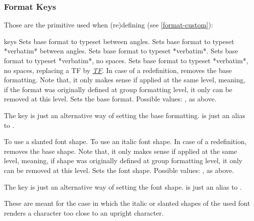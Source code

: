 \documentclass{article}
\begin{document}
\subsubsection{Format Keys}\label{format-keys}
Those are the primitive  used when (re)defining   (see \ref{format-custom}):
\begin{describelist*}{keys}
   {Sets base format to typeset between angles.}
   {Sets base format to typeset *verbatim* between angles.}
   {Sets base format to typeset *verbatim*.}
   {Sets base format to typeset *verbatim*, no spaces.}
   {Sets base format to typeset *verbatim*, no spaces, replacing a TF by {\slshape\underline{TF}}.}
   {In case of a redefinition, removes the base formatting. Note that, it only makes sense if applied at the same level, meaning, if the format was originally defined at group formatting level, it only can be removed at this level.}
   {Sets the base format. Possible values: , as above.}
  \begin{tsremark}
    The  key is just an alternative way of setting the base formatting.  is just an alias to .
  \end{tsremark}
   {To use a slanted font shape.}
   {To use an italic font shape.}
   {In case of a redefinition, removes the base shape. Note that, it only makes sense if applied at the same level, meaning, if shape was originally defined at group formatting level,  it only can be removed at this level.}
   {Sets the font shape. Possible values: , as above.}
  \begin{tsremark}
    The  key is just an alternative way of setting the font shape.  is just an alias to .
  \end{tsremark}
  \begin{tsremark}
    These are meant for the case in which the italic or slanted shapes of the used font renders a character too close to an upright character. 
  \end{tsremark}
  

\end{describelist*}
\end{document}
